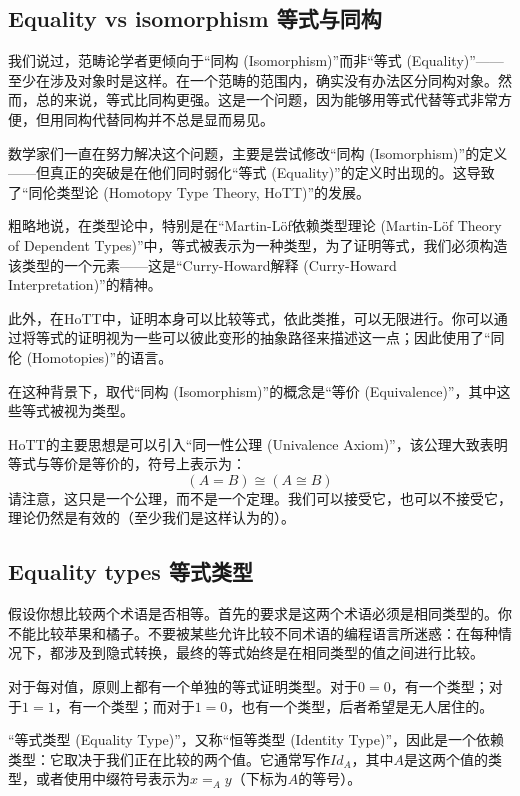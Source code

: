 \documentclass[DaoFP]{subfiles}
\begin{document}
 \subsection{Equality vs isomorphism 等式与同构}

 我们说过，范畴论学者更倾向于“同构 (Isomorphism)”而非“等式 (Equality)”——至少在涉及对象时是这样。在一个范畴的范围内，确实没有办法区分同构对象。然而，总的来说，等式比同构更强。这是一个问题，因为能够用等式代替等式非常方便，但用同构代替同构并不总是显而易见。

 数学家们一直在努力解决这个问题，主要是尝试修改“同构 (Isomorphism)”的定义——但真正的突破是在他们同时弱化“等式 (Equality)”的定义时出现的。这导致了“同伦类型论 (Homotopy Type Theory, HoTT)”的发展。

 粗略地说，在类型论中，特别是在“Martin-Löf依赖类型理论 (Martin-Löf Theory of Dependent Types)”中，等式被表示为一种类型，为了证明等式，我们必须构造该类型的一个元素——这是“Curry-Howard解释 (Curry-Howard Interpretation)”的精神。

 此外，在HoTT中，证明本身可以比较等式，依此类推，可以无限进行。你可以通过将等式的证明视为一些可以彼此变形的抽象路径来描述这一点；因此使用了“同伦 (Homotopies)”的语言。

 在这种背景下，取代“同构 (Isomorphism)”的概念是“等价 (Equivalence)”，其中这些等式被视为类型。

 HoTT的主要思想是可以引入“同一性公理 (Univalence Axiom)”，该公理大致表明等式与等价是等价的，符号上表示为：
 \[ (A = B) \cong (A \cong B) \]
 请注意，这只是一个公理，而不是一个定理。我们可以接受它，也可以不接受它，理论仍然是有效的（至少我们是这样认为的）。

 \subsection{Equality types 等式类型}

 假设你想比较两个术语是否相等。首先的要求是这两个术语必须是相同类型的。你不能比较苹果和橘子。不要被某些允许比较不同术语的编程语言所迷惑：在每种情况下，都涉及到隐式转换，最终的等式始终是在相同类型的值之间进行比较。

 对于每对值，原则上都有一个单独的等式证明类型。对于$0 = 0$，有一个类型；对于$1=1$，有一个类型；而对于$1 = 0$，也有一个类型，后者希望是无人居住的。

 “等式类型 (Equality Type)”，又称“恒等类型 (Identity Type)”，因此是一个依赖类型：它取决于我们正在比较的两个值。它通常写作$\mathit{Id}_A$，其中$A$是这两个值的类型，或者使用中缀符号表示为$x=_A y$（下标为$A$的等号）。
\end{document}
